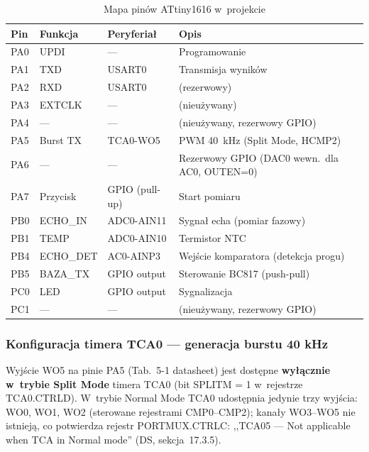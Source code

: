 \documentclass[a4paper,11pt]{article}
\begin{document}
\begin{table}[H]
    \centering
    \caption{Mapa pinów ATtiny1616 w~projekcie}
    \label{tab:pinout}
    \begin{tabularx}{\textwidth}{l l l X}
        \toprule
        \textbf{Pin} & \textbf{Funkcja} & \textbf{Peryferiał} & \textbf{Opis} \\
        \midrule
        PA0 & UPDI & --- & Programowanie \\
        PA1 & TXD & USART0 & Transmisja wyników \\
        PA2 & RXD & USART0 & (rezerwowy) \\
        PA3 & EXTCLK & --- & (nieużywany) \\
        PA4 & --- & --- & (nieużywany, rezerwowy GPIO) \\
        PA5 & Burst TX & TCA0-WO5 & PWM \SI{40}{\kilo\hertz} (Split Mode, HCMP2) \\
        PA6 & --- & --- & Rezerwowy GPIO (DAC0 wewn.\ dla AC0, OUTEN=0) \\
        PA7 & Przycisk & GPIO (pull-up) & Start pomiaru \\
        PB0 & ECHO\_IN & ADC0-AIN11 & Sygnał echa (pomiar fazowy) \\
        PB1 & TEMP & ADC0-AIN10 & Termistor NTC \\
        PB4 & ECHO\_DET & AC0-AINP3 & Wejście komparatora (detekcja progu) \\
        PB5 & BAZA\_TX & GPIO output & Sterowanie BC817 (push-pull) \\
        PC0 & LED & GPIO output & Sygnalizacja \\
        PC1 & --- & --- & (nieużywany, rezerwowy GPIO) \\
        \bottomrule
    \end{tabularx}
\end{table}

\subsubsection{Konfiguracja timera TCA0 --- generacja burstu 40 kHz}

Wyjście WO5 na pinie PA5 (Tab.~5-1 datasheet) jest dostępne \textbf{wyłącznie
w~trybie Split Mode} timera TCA0 (bit SPLITM = 1 w~rejestrze TCA0.CTRLD).
W~trybie Normal Mode TCA0 udostępnia jedynie trzy wyjścia: WO0, WO1, WO2
(sterowane rejestrami CMP0--CMP2); kanały WO3--WO5 nie istnieją, co potwierdza
rejestr PORTMUX.CTRLC: ,,TCA05 --- Not applicable when TCA in Normal mode''
(DS, sekcja~17.3.5).
\end{document}
